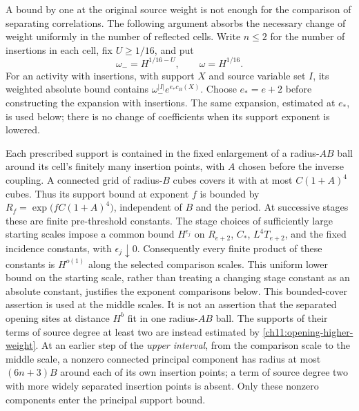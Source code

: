 A bound by one at the original source weight is not enough for the
comparison of separating correlations. The following argument absorbs the necessary change
of weight uniformly in the number of reflected cells. Write $n\le2$
for the number of insertions in each cell, fix $U\ge1/16$, and put
\[
 \omega_-=H^{1/16-U},\qquad \omega=H^{1/16}.
\]
For an activity with insertions, with support $X$ and source variable set $I$, its
weighted absolute bound contains $\omega_-^{|I|}e^{e_*c_B(X)}$.
Choose $e_*=e+2$ before constructing the expansion with insertions.
The same expansion, estimated at $e_*$, is used below; there is
no change of coefficients when its support exponent is lowered.

Each prescribed support is contained in the fixed enlargement of a
radius-$AB$ ball around its cell's finitely many insertion points, with $A$
chosen before the inverse coupling. A connected grid of radius-$B$ cubes
covers it with at most $C(1+A)^4$ cubes. Thus its support bound
at exponent $f$ is bounded by
$R_f=\exp\bigl(fC(1+A)^4\bigr)$, independent of $B$ and the period.
At successive stages these are finite pre-threshold constants.
The stage choices of sufficiently large starting scales impose a common bound $H^{\epsilon_j}$
on $R_{e+2}$, $C_*$, $L^4T_{e+2}$, and the fixed incidence
constants, with $\epsilon_j\downarrow0$.
Consequently every finite product of these constants is
$H^{o(1)}$ along the selected comparison scales.
This uniform lower bound on the starting scale, rather than treating a changing stage
constant as an absolute constant, justifies the exponent
comparisons below.
This bounded-cover assertion is used at the middle scales.
It is not an assertion that the separated opening sites
at distance $H^b$ fit in one radius-$AB$ ball.
The supports of their terms of source degree at least two are instead estimated by
\eqref{ch11:opening-higher-weight}.
At an earlier step of the \emph{upper interval}, from the comparison scale to the middle scale, a nonzero connected principal component
has radius at most $(6n+3)B$ around each of its own insertion points;
a term of source degree two with more widely separated insertion points is absent.
Only these nonzero components enter the principal support bound.

